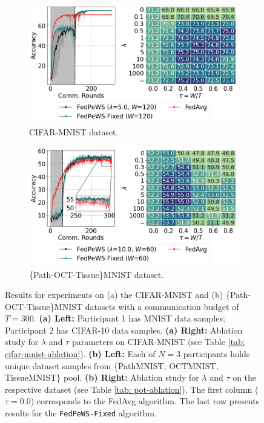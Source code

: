 \documentclass{article}
\begin{document}
\begin{figure}[t]
    \centering
    \begin{subfigure}[t]{0.495\linewidth}
        \centering
        \includegraphics[width=\linewidth]{images/cifarmnist-both-last-v2.pdf}
        \caption{CIFAR-MNIST dataset.}
        \label{fig: cifar-mnist-figure-heatmap}
    \end{subfigure}
    \hfill
    \begin{subfigure}[t]{0.495\linewidth}
        \centering
        \includegraphics[width=\linewidth]{images/pot-both-last-v2.pdf}
        \caption{\{Path-OCT-Tissue\}MNIST dataset.}
        \label{fig: pot-figure-heatmap}
    \end{subfigure}
    \caption{Results for experiments on (a) the CIFAR-MNIST and (b) \{Path-OCT-Tissue\}MNIST datasets with a communication budget of $T=300$. \textbf{(a) Left:} Participant 1 has MNIST data samples; Participant 2 has CIFAR-10 data samples. \textbf{(a) Right:} Ablation study for $\lambda$ and $\tau$ parameters on CIFAR-MNIST (see Table \ref{tab: cifar-mnist-ablation}). \textbf{(b) Left:} Each of $N=3$ participants holds unique dataset samples from \{PathMNIST, OCTMNIST, TissueMNIST\} pool. \textbf{(b) Right:} Ablation study for $\lambda$ and $\tau$ on the respective dataset (see Table \ref{tab: pot-ablation}). The first column ($\tau=0.0$) corresponds to the FedAvg algorithm. The last row presents results for the \texttt{FedPeWS-Fixed} algorithm.}
    \label{fig: cifar-mnist-pot-accuracy-heatmap} 
\end{figure}
\end{document}
